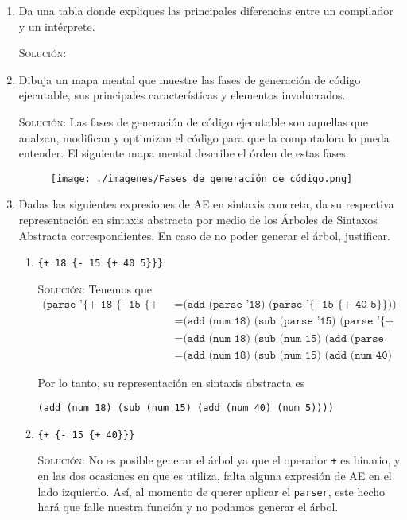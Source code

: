 \documentclass[letterpaper,11pt]{article}
\begin{document}
\begin{enumerate}
    \item Da una tabla donde expliques las principales diferencias entre un 
    compilador y un intérprete.

    \textsc{Solución:}

    \item Dibuja un mapa mental que muestre las fases de generación de código
    ejecutable, sus principales características y elementos involucrados.

    \textsc{Solución:} Las fases de generación de código ejecutable son aquellas 
    que analzan, modifican y optimizan el código para que la computadora lo 
    pueda entender. El siguiente mapa mental describe el órden de estas fases.
    \begin{figure}[ht]
        \centering
        \texttt{[image: ./imagenes/Fases de generación de código.png]}
    \end{figure}

    \item Dadas las siguientes expresiones de AE en sintaxis concreta, da su 
    respectiva representación en sintaxis abstracta por medio de los Árboles 
    de Sintaxos Abstracta correspondientes. En caso de no poder generar el
    árbol, justificar. 
    \begin{enumerate}
        \item \texttt{\{+ 18 \{- 15 \{+ 40 5\}\}\}}
        
        \textsc{Solución:} Tenemos que 
        \begin{align*}
            \texttt{(parse '\{+ 18 \{- 15 \{+ 40 5\}\}\})}
            &= \texttt{(add (parse '18) (parse '\{- 15 \{+ 40 5\}\}))} \\
            &= \texttt{(add (num 18) (sub (parse '15) (parse '\{+ 40 5\})))} \\
            &= \texttt{(add (num 18) (sub (num 15) (add (parse '40) (parse '5))))} \\
            &= \texttt{(add (num 18) (sub (num 15) (add (num 40) (num 5))))}
        \end{align*}

        Por lo tanto, su representación en sintaxis abstracta es 
        \begin{center}
            \texttt{(add (num 18) (sub (num 15) (add (num 40) (num 5))))}
        \end{center}

        \item \texttt{\{+ \{- 15 \{+ 40\}\}\}}

        \textsc{Solución:} No es posible generar el árbol ya que el operador 
        \texttt{+} es binario, y en las dos ocasiones en que es utiliza, falta 
        alguna expresión de AE en el lado izquierdo. Así, al momento de
        querer aplicar el \texttt{parser}, este hecho hará que falle nuestra 
        función y no podamos generar el árbol. 
    \end{enumerate}
\end{enumerate}
\end{document}
